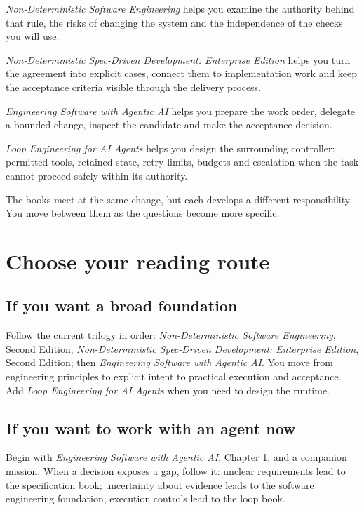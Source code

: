 \documentclass[11pt]{article}
\begin{document}
\emph{Non-Deterministic Software Engineering} helps you examine the authority behind that rule, the risks of changing the system and the independence of the checks you will use.

\emph{Non-Deterministic Spec-Driven Development: Enterprise Edition} helps you turn the agreement into explicit cases, connect them to implementation work and keep the acceptance criteria visible through the delivery process.

\emph{Engineering Software with Agentic AI} helps you prepare the work order, delegate a bounded change, inspect the candidate and make the acceptance decision.

\emph{Loop Engineering for AI Agents} helps you design the surrounding controller: permitted tools, retained state, retry limits, budgets and escalation when the task cannot proceed safely within its authority.

The books meet at the same change, but each develops a different responsibility. You move between them as the questions become more specific.

\section{Choose your reading route}

\subsection{If you want a broad foundation}

Follow the current trilogy in order: \emph{Non-Deterministic Software Engineering}, Second Edition; \emph{Non-Deterministic Spec-Driven Development: Enterprise Edition}, Second Edition; then \emph{Engineering Software with Agentic AI}. You move from engineering principles to explicit intent to practical execution and acceptance. Add \emph{Loop Engineering for AI Agents} when you need to design the runtime.

\subsection{If you want to work with an agent now}

Begin with \emph{Engineering Software with Agentic AI}, Chapter 1, and a companion mission. When a decision exposes a gap, follow it: unclear requirements lead to the specification book; uncertainty about evidence leads to the software engineering foundation; execution controls lead to the loop book.
\end{document}
